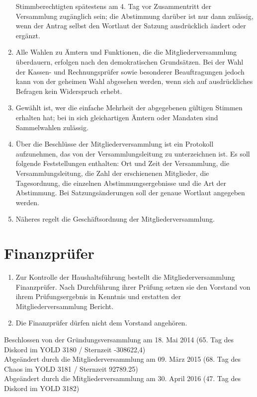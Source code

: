 \begin{enumerate}
		Stimmberechtigten spätestens am 4. Tag vor Zusammentritt der Versammlung zugänglich sein; die Abstimmung darüber ist nur dann zulässig, wenn der Antrag selbst den Wortlaut der Satzung ausdrücklich ändert oder ergänzt.
	\item Alle Wahlen zu Ämtern und Funktionen, die die Mitgliederversammlung überdauern, erfolgen nach den demokratischen Grundsätzen. Bei der Wahl der Kassen- und Rechnungsprüfer sowie besonderer Beauftragungen jedoch kann von der geheimen Wahl abgesehen werden, wenn sich auf ausdrückliches Befragen kein Widerspruch erhebt.
	\item Gewählt ist, wer die einfache Mehrheit der abgegebenen gültigen Stimmen erhalten hat; bei in sich gleichartigen Ämtern oder Mandaten sind Sammelwahlen zulässig.
	\item Über die Beschlüsse der Mitgliederversammlung ist ein Protokoll aufzunehmen, das von der Versammlungsleitung zu unterzeichnen ist. Es soll folgende Feststellungen enthalten: Ort und Zeit der Versammlung, die Versammlungsleitung, die Zahl der erschienenen Mitglieder, die Tagesordnung, die einzelnen Abstimmungsergebnisse und die Art der Abstimmung. Bei Satzungsänderungen soll der genaue Wortlaut angegeben werden.
	\item Näheres regelt die Geschäftsordnung der Mitgliederversammlung.

\end{enumerate}

\chapter{Finanzprüfer}

\begin{enumerate}
	\item Zur Kontrolle der Haushaltsführung bestellt die Mitgliederversammlung Finanzprüfer. Nach Durchführung ihrer Prüfung setzen sie den Vorstand von ihrem Prüfungsergebnis in Kenntnis und erstatten der Mitgliederversammlung Bericht.
	\item Die Finanzprüfer dürfen nicht dem Vorstand angehören.
\end{enumerate}

\vfill

Beschlossen von der Gründungsversammlung am 18. Mai 2014 (65. Tag des Diskord im YOLD 3180 / Sternzeit -308622,4)\\
Abgeändert durch die Mitgliederversammlung am 09. März 2015 (68. Tag des Chaos im YOLD 3181 / Sternzeit 92789.25)\\
Abgeändert durch die Mitgliederversammlung am 30. April 2016 (47. Tag des Diskord im YOLD 3182)\\
